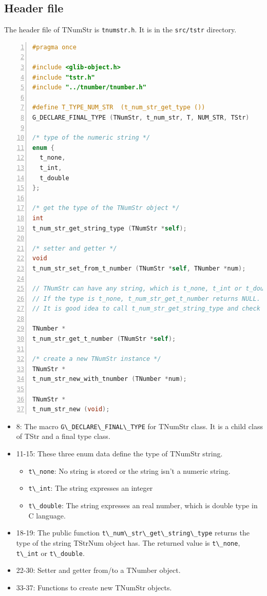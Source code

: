 \subsection{Header file}\label{header-file}

The header file of TNumStr is \passthrough{\lstinline!tnumstr.h!}. It is
in the \passthrough{\lstinline!src/tstr!} directory.

\begin{lstlisting}[language=C, numbers=left]
#pragma once

#include <glib-object.h>
#include "tstr.h"
#include "../tnumber/tnumber.h"

#define T_TYPE_NUM_STR  (t_num_str_get_type ())
G_DECLARE_FINAL_TYPE (TNumStr, t_num_str, T, NUM_STR, TStr)

/* type of the numeric string */
enum {
  t_none,
  t_int,
  t_double
};

/* get the type of the TNumStr object */
int
t_num_str_get_string_type (TNumStr *self);

/* setter and getter */
void
t_num_str_set_from_t_number (TNumStr *self, TNumber *num);

// TNumStr can have any string, which is t_none, t_int or t_double type.
// If the type is t_none, t_num_str_get_t_number returns NULL.
// It is good idea to call t_num_str_get_string_type and check the type in advance. 

TNumber *
t_num_str_get_t_number (TNumStr *self);

/* create a new TNumStr instance */
TNumStr *
t_num_str_new_with_tnumber (TNumber *num);

TNumStr *
t_num_str_new (void);
\end{lstlisting}

\begin{itemize}
\tightlist
\item
  8: The macro \passthrough{\lstinline!G\_DECLARE\_FINAL\_TYPE!} for
  TNumStr class. It is a child class of TStr and a final type class.
\item
  11-15: These three enum data define the type of TNumStr string.

  \begin{itemize}
  \tightlist
  \item
    \passthrough{\lstinline!t\_none!}: No string is stored or the string
    isn't a numeric string.
  \item
    \passthrough{\lstinline!t\_int!}: The string expresses an integer
  \item
    \passthrough{\lstinline!t\_double!}: The string expresses an real
    number, which is double type in C language.
  \end{itemize}
\item
  18-19: The public function
  \passthrough{\lstinline!t\_num\_str\_get\_string\_type!} returns the
  type of the string TStrNum object has. The returned value is
  \passthrough{\lstinline!t\_none!}, \passthrough{\lstinline!t\_int!} or
  \passthrough{\lstinline!t\_double!}.
\item
  22-30: Setter and getter from/to a TNumber object.
\item
  33-37: Functions to create new TNumStr objects.
\end{itemize}


